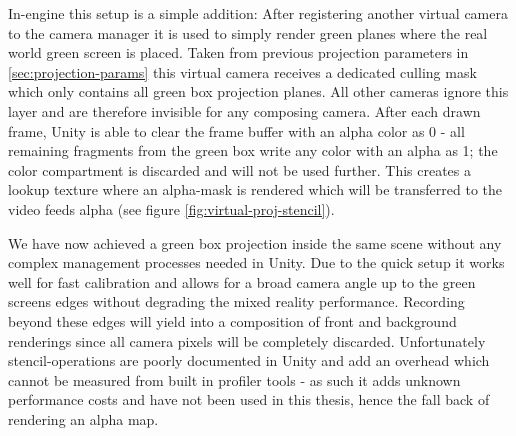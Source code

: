 In-engine this setup is a simple addition: After registering another virtual 
camera to the camera manager it is used to simply render green planes where the 
real world green screen is placed. Taken from previous projection parameters in 
\ref{sec:projection-params} this virtual camera receives a dedicated culling 
mask which only contains all green box projection planes. All other cameras 
ignore this layer and are therefore invisible for any composing camera. After 
each drawn frame, Unity is able to clear the frame buffer with an alpha color 
as 0 - all remaining fragments from the green box write any color with an alpha 
as 1; the color compartment is discarded and will not be used further. This 
creates a lookup texture where an alpha-mask is rendered which will be 
transferred to the video feeds alpha (see figure 
\ref{fig:virtual-proj-stencil}).

We have now achieved a green box projection inside the same scene without any 
complex management processes needed in Unity. Due to the quick setup it works 
well for fast calibration and allows for a broad camera angle up to the green 
screens edges without degrading the mixed reality performance. Recording beyond 
these edges will yield into a composition of front and background renderings 
since all camera pixels will be completely discarded.
\newline
Unfortunately stencil-operations are poorly documented in Unity and add an 
overhead which cannot be measured from built in profiler tools - as such it 
adds unknown performance costs and have not been used in this thesis, hence the 
fall back of rendering an alpha map.